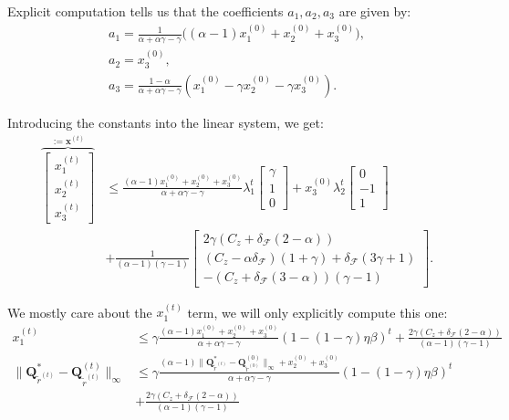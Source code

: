     Explicit computation tells us that the coefficients $a_1,a_2,a_3$ are given by:
    \begin{align*}
        a_1 = \frac{1}{\alpha + \alpha\gamma - \gamma} \Big( (\alpha - 1)x_1^{(0)}+x_2^{(0)}+x_3^{(0)} \Big),\\
        a_2 = x_3^{(0)},\\
        a_3 = \frac{1 - \alpha}{\alpha + \alpha\gamma - \gamma} (x_1^{(0)} - \gamma x_2^{(0)} - \gamma x_3^{(0)}).
    \end{align*}

    Introducing the constants into the linear system, we get:
    \begin{align*}
        \overbrace{\begin{bmatrix}
            x_1^{(t)}\\
            x_2^{(t)}\\
            x_3^{(t)} 
        \end{bmatrix}}^{:=\bm{x}^{(t)}}
        &\leq
        \frac{(\alpha - 1)x_1^{(0)}+x_2^{(0)}+x_3^{(0)} }{\alpha + \alpha\gamma - \gamma}
        \lambda_1^t 
        \begin{bmatrix}
            \gamma \\ 1 \\ 0
        \end{bmatrix}
        + x_3^{(0)}
        \lambda_2^t
        \begin{bmatrix}
            0 \\ -1 \\ 1
        \end{bmatrix}
        \\ & +
        \frac{1}{(\alpha-1)(\gamma-1)}
        \begin{bmatrix}
            2\gamma (C_z+\delta_\mathcal{F}(2-\alpha))\\
            (C_z-\alpha \delta_\mathcal{F}) (1+\gamma) + \delta_\mathcal{F} (3 \gamma + 1) \\
            -(C_z+\delta_\mathcal{F} (3-\alpha))(\gamma - 1)
        \end{bmatrix}.
    \end{align*}

    We mostly care about the $x_1^{(t)}$ term, we will only explicitly compute this one:
    \begin{align*}
        x_1^{(t)} &\leq\gamma \frac{(\alpha - 1)x_1^{(0)}+x_2^{(0)}+x_3^{(0)} }{\alpha + \alpha\gamma - \gamma}
        (1 - (1-\gamma)\eta\beta)^t 
        + \frac{2\gamma (C_z+\delta_\mathcal{F}(2-\alpha))}{(\alpha-1)(\gamma-1)} \\
        \| \bm{Q}^*_{\tilde{r}^{(t)}}
        -\bm{Q}^{(t)}_{\tilde{r}^{(t)}} \|_\infty 
        &\leq\gamma \frac{(\alpha - 1)
        \| \bm{Q}^*_{\tilde{r}^{(t)}}
        -\bm{Q}^{(0)}_{\tilde{r}^{(0)}} \|_\infty 
        +x_2^{(0)}+x_3^{(0)} }{\alpha + \alpha\gamma - \gamma}
        (1 - (1-\gamma)\eta\beta)^t  \\ &
        + \frac{2\gamma (C_z+\delta_\mathcal{F}(2-\alpha))}{(\alpha-1)(\gamma-1)} \\
    \end{align*}


